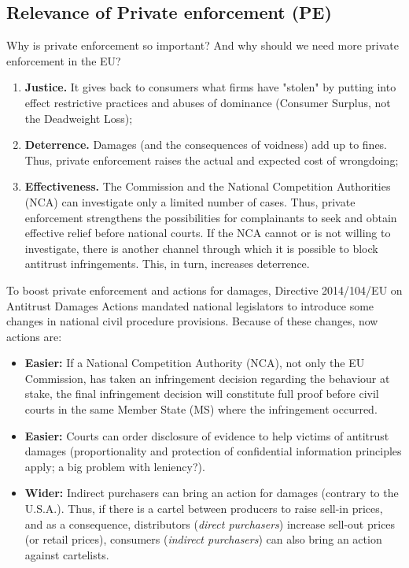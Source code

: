     \subsection{Relevance of Private enforcement (PE)}

        \noindent Why is private enforcement so important? And why should we need more private enforcement in the EU?

        \begin{enumerate}
            \item \textbf{Justice.} It gives back to consumers what firms have "stolen" by putting into effect restrictive practices and abuses of dominance (Consumer Surplus, not the Deadweight Loss);
            \item \textbf{Deterrence.} Damages (and the consequences of voidness) add up to fines. Thus, private enforcement raises the actual and expected cost of wrongdoing;
            \item \textbf{Effectiveness.} The Commission and the National Competition Authorities (NCA) can investigate only a limited number of cases. Thus, private enforcement strengthens the possibilities for complainants to seek and obtain effective relief before national courts. If the NCA cannot or is not willing to investigate, there is another channel through which it is possible to block antitrust infringements. This, in turn, increases deterrence.
        \end{enumerate}

        To boost private enforcement and actions for damages, Directive 2014/104/EU on Antitrust Damages Actions mandated national legislators to introduce some changes in national civil procedure provisions. Because of these changes, now actions are:

        \begin{itemize}
            \item \textbf{Easier:} If a National Competition Authority (NCA), not only the EU Commission, has taken an infringement decision regarding the behaviour at stake, the final infringement decision will constitute full proof before civil courts in the same Member State (MS) where the infringement occurred.
            \item \textbf{Easier:} Courts can order disclosure of evidence to help victims of antitrust damages (proportionality and protection of confidential information principles apply; a big problem with leniency?).
            \item \textbf{Wider:} Indirect purchasers can bring an action for damages (contrary to the U.S.A.). Thus, if there is a cartel between producers to raise sell-in prices, and as a consequence, distributors (\textit{direct purchasers}) increase sell-out prices (or retail prices), consumers (\textit{indirect purchasers}) can also bring an action against cartelists.
        \end{itemize}

